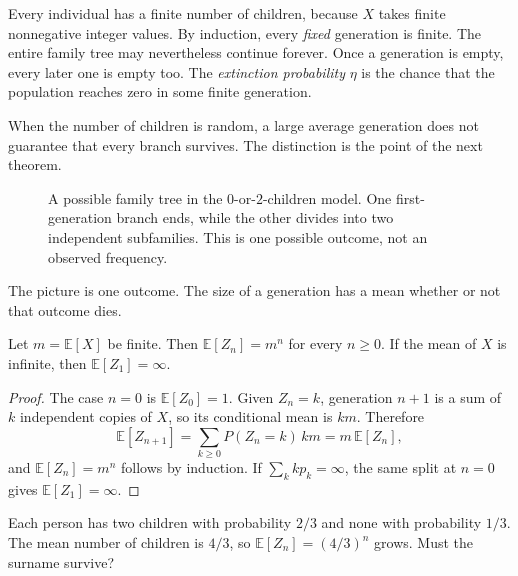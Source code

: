 Every individual has a finite number of children, because $X$ takes finite nonnegative integer values. By induction, every \emph{fixed} generation is finite. The entire family tree may nevertheless continue forever. Once a generation is empty, every later one is empty too. The \emph{extinction probability} $\eta$ is the chance that the population reaches zero in some finite generation.

When the number of children is random, a large average generation does not guarantee that every branch survives. The distinction is the point of the next theorem.

\begin{figure}[ht]
\centering
{}
\caption{A possible family tree in the $0$-or-$2$-children model. One first-generation branch ends, while the other divides into two independent subfamilies. This is one possible outcome, not an observed frequency.}
\label{fig:familytree}
\end{figure}

The picture is one outcome. The size of a generation has a mean whether or not that outcome dies.

\begin{proposition}\label{prop:genmean}
Let $m=\mathbb E[X]$ be finite. Then $\mathbb E[Z_n]=m^n$ for every $n\ge0$. If the mean of $X$ is infinite, then $\mathbb E[Z_1]=\infty$.
\end{proposition}
\begin{proof}
The case $n=0$ is $\mathbb E[Z_0]=1$. Given $Z_n=k$, generation $n+1$ is a sum of $k$ independent copies of $X$, so its conditional mean is $km$. Therefore
\[
 \mathbb E[Z_{n+1}]=\sum_{k\ge0}P(Z_n=k)\,km=m\,\mathbb E[Z_n],
\]
and $\mathbb E[Z_n]=m^n$ follows by induction. If $\sum_k kp_k=\infty$, the same split at $n=0$ gives $\mathbb E[Z_1]=\infty$.
\end{proof}

\begin{think}
Each person has two children with probability $2/3$ and none with probability $1/3$. The mean number of children is $4/3$, so $\mathbb E[Z_n]=(4/3)^n$ grows. Must the surname survive?
\end{think}


